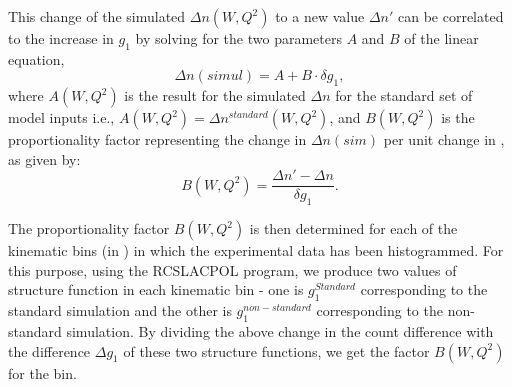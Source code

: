 This change of the simulated $\Delta n (W,Q^2)$ to a new value $\Delta n'$ can be correlated to the increase in $g_1$ by solving for the two parameters $A$ and $B$ of the linear equation,
\begin{equation}
\Delta n(simul) = A + B\cdot \delta g_1,
\end{equation} %
where $A(W,Q^2) $ is the result for the simulated $\Delta n$ for the standard set of model inputs i.e., $A(W,Q^2)= \Delta n^{standard}(W,Q^2)$, and $B(W,Q^2) $ is the proportionality factor representing the change in $\Delta n(sim)$ per unit change in \gone, as given by:
\begin{equation}
\label{propFac}
B(W,Q^2)  = \frac{\Delta n' - \Delta n}{\delta g_1}.
\end{equation}


The proportionality factor  $B(W,Q^2)$ is then determined for each of the kinematic bins (in \wq) in which the experimental data has been histogrammed. For this purpose, using the RCSLACPOL program, we produce two values of structure function \gones in each kinematic bin - one is $g_1^{Standard}$ corresponding to the standard simulation and the other is $g_1^{non-standard}$ corresponding to the non-standard simulation. By dividing the above change in the count difference with the difference $\Delta g_1$ of these two structure functions, we get the factor $B(W,Q^2)$ for the bin. 



